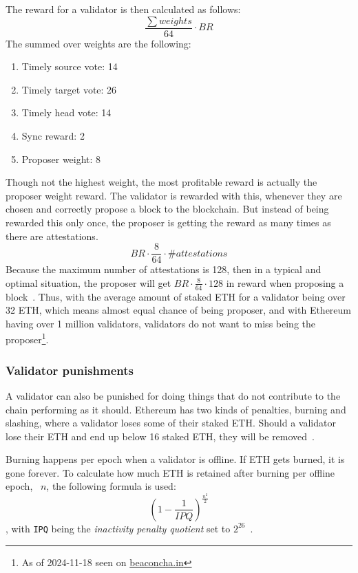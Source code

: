 The reward for a validator is then calculated as follows:
\begin{equation}
    \frac{\sum{weights}}{64}\cdot BR
    \label{eq:valrewards}
\end{equation}
The summed over weights are the following:
\begin{enumerate}
    \item Timely source vote: 14
    \item Timely target vote: 26
    \item Timely head vote: 14
    \item Sync reward: 2
    \item Proposer weight: 8
\end{enumerate}
Though not the highest weight, the most profitable reward is actually the proposer weight reward.
The validator is rewarded with this, whenever they are chosen and correctly propose a block to the blockchain.
But instead of being rewarded this only once, the proposer is getting the reward as many times as there are attestations.
\begin{equation}
    BR\cdot\frac{8}{64}\cdot \#attestations\label
    {eq:propreward}
\end{equation}
Because the maximum number of attestations is 128, then in a typical and optimal situation, the proposer will get $BR\cdot\frac{8}{64}\cdot128$ in reward when proposing a block~\cite{PoSRewAndPen,consensus-spec-phase-0}.
Thus, with the average amount of staked ETH for a validator being over 32 ETH, which means almost equal chance of being proposer, and with Ethereum having over 1 million validators, validators do not want to miss being the proposer\footnote{As of 2024-11-18 seen on \href{https://beaconcha.in/}{beaconcha.in}}.

\subsubsection{Validator punishments}\label{subsubsec:valpunish}
A validator can also be punished for doing things that do not contribute to the chain performing as it should.
Ethereum has two kinds of penalties, burning and slashing, where a validator loses some of their staked ETH\@.
Should a validator lose their ETH and end up below 16 staked ETH, they will be removed~\cite{consensus-spec-phase-0}.


Burning happens per epoch when a validator is offline.
If ETH gets burned, it is gone forever.
To calculate how much ETH is retained after burning per offline epoch, ~$n$, the following formula is used:
\begin{equation}
\left(1-\frac{1}{IPQ}\right)^\frac{n^2}{2}
\label{eq:burn}
\end{equation}, with \texttt{IPQ} being the \textit{inactivity penalty quotient} set to $2^{26}$~\cite{consensus-spec-phase-0}.


